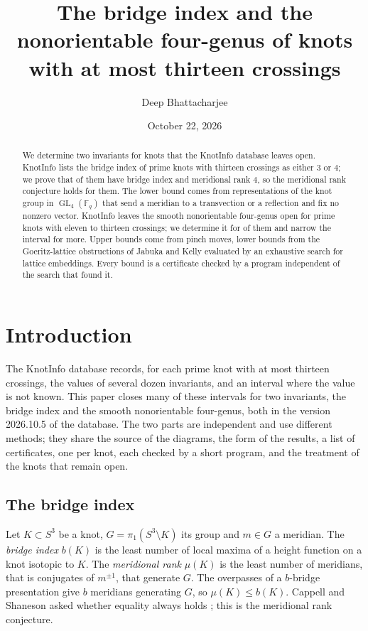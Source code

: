 \documentclass[11pt]{amsart}
\title[Bridge index and nonorientable four-genus through thirteen crossings]{The bridge index and the nonorientable four-genus of knots with at most thirteen crossings}
\author{Deep Bhattacharjee}
\date{October 22, 2026}
\theoremstyle{definition}
\theoremstyle{remark}
\numberwithin{equation}{section}
\newcommand{\F}{\mathbb{F}}
\DeclareMathOperator{\GL}{GL}
\begin{document}
\begin{abstract}
We determine two invariants for knots that the KnotInfo database leaves open. KnotInfo lists
the bridge index of \btotal{} prime knots with thirteen crossings as either $3$ or $4$; we
prove that \bclosed{} of them have bridge index and meridional rank $4$, so the meridional
rank conjecture holds for them. The lower bound comes from representations of the knot
group in $\GL_4(\F_q)$ that send a meridian to a transvection or a reflection and fix no
nonzero vector. KnotInfo leaves the smooth nonorientable four-genus open for \ntotal{}
prime knots with eleven to thirteen crossings; we determine it for \nsettled{} of them and
narrow the interval for \nnarrowed{} more. Upper bounds come from pinch moves, lower bounds
from the Goeritz-lattice obstructions of Jabuka and Kelly evaluated by an exhaustive search
for lattice embeddings. Every bound is a certificate checked by a program independent of
the search that found it.
\end{abstract}
\maketitle

\section{Introduction}

The KnotInfo database \cite{KnotInfo} records, for each prime knot with at most thirteen
crossings, the values of several dozen invariants, and an interval where the value is not
known. This paper closes many of these intervals for two invariants, the bridge index and
the smooth nonorientable four-genus, both in the version 2026.10.5 of the database. The two
parts are independent and use different methods; they share the source of the diagrams,
the form of the results, a list of certificates, one per knot, each checked by a short
program, and the treatment of the knots that remain open.

\subsection*{The bridge index}
Let $K\subset S^3$ be a knot, $G=\pi_1(S^3\setminus K)$ its group and $m\in G$ a meridian.
The \emph{bridge index} $b(K)$ is the least number of local maxima of a height function on
a knot isotopic to $K$. The \emph{meridional rank} $\mu(K)$ is the least number of
meridians, that is conjugates of $m^{\pm1}$, that generate $G$. The overpasses of a
$b$-bridge presentation give $b$ meridians generating $G$, so $\mu(K)\le b(K)$. Cappell and
Shaneson asked whether equality always holds \cite[Problem~1.11]{Kirby}; this is the
meridional rank conjecture.
\end{document}
